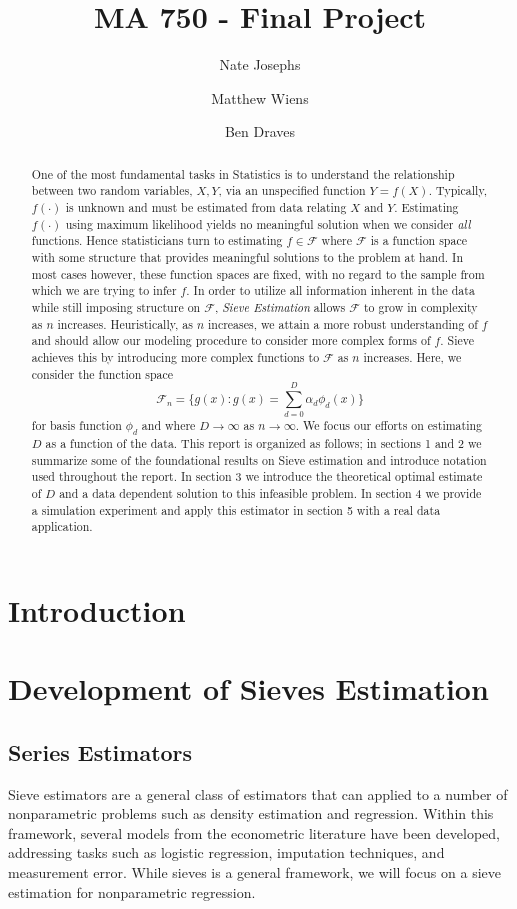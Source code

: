 \documentclass[12pt]{article}  %
\title{MA 750 - Final Project}
\author{
  Nate Josephs\\
  \and
  Matthew Wiens 
  \and 
  Ben Draves
}
\begin{document}
\maketitle 
\begin{abstract} One of the most fundamental tasks in Statistics is to understand the relationship between two random variables, $X,Y$, via an unspecified function $Y = f(X)$. Typically, $f(\cdot)$ is unknown and must be estimated from data relating $X$ and $Y$. Estimating $f(\cdot)$ using maximum likelihood yields no meaningful solution when we consider \textit{all} functions. Hence statisticians turn to estimating $f\in\mathcal{F}$ where $\mathcal{F}$ is a function space with some structure that provides meaningful solutions to the problem at hand. In most cases however, these function spaces are fixed, with no regard to the sample from which we are trying to infer $f$. In order to utilize all information inherent in the data while still imposing structure on $\mathcal{F}$, \textit{Sieve Estimation} allows $\mathcal{F}$ to grow in complexity as $n$ increases. Heuristically, as $n$ increases, we attain a more robust understanding of $f$ and should allow our modeling procedure to consider more complex forms of $f$. Sieve achieves this by introducing more complex functions to $\mathcal{F}$ as $n$ increases. Here, we consider the function space $$\mathcal{F}_n = \Big\{g(x): g(x) = \sum_{d=0}^{D}\alpha_d\phi_d(x)\Big\}$$ for basis function $\phi_d$ and where $D\to\infty$ as $n\to\infty$. We focus our efforts on estimating $D$ as a function of the data. This report is organized as follows; in sections 1 and 2 we summarize some of the foundational results on Sieve estimation and introduce notation used throughout the report. In section 3 we introduce the theoretical optimal estimate of $D$ and a data dependent solution to this infeasible problem. In section 4 we provide a simulation experiment and apply this estimator in section 5 with a real data application. 
\end{abstract}

\section{Introduction}
\section{Development of Sieves Estimation}

\subsection{Series Estimators}
Sieve estimators are a general class of estimators that can applied to a number of nonparametric problems such as density estimation and regression. Within this framework, several models from the econometric literature have been developed, addressing tasks such as logistic regression, imputation techniques, and measurement error. While sieves is a general framework, we will focus on a sieve estimation for nonparametric regression. 
\end{document}
